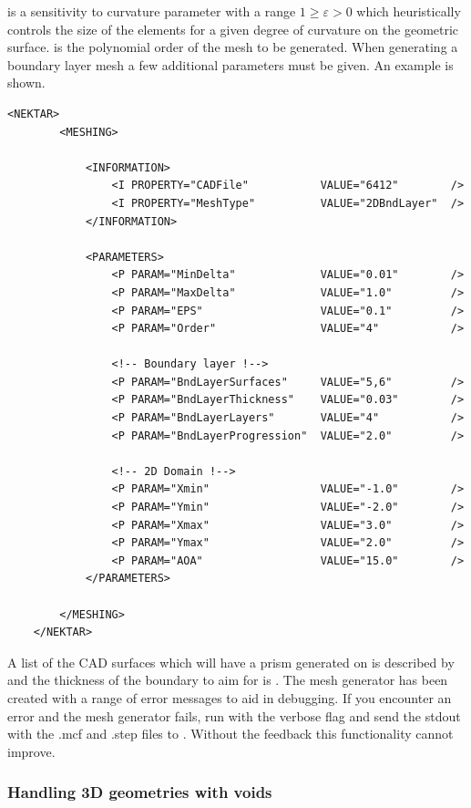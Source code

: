 is a sensitivity to curvature parameter with a range $1 \geq \varepsilon > 0$
which heuristically controls the size of the elements for a given degree of
curvature on the geometric surface.  is the polynomial order of the
mesh to be generated.
%
When generating a boundary layer mesh a few additional parameters must be given.
An example is shown.
\begin{lstlisting}[style=XmlStyle]
    <NEKTAR>
        <MESHING>

            <INFORMATION>
                <I PROPERTY="CADFile"           VALUE="6412"        />
                <I PROPERTY="MeshType"          VALUE="2DBndLayer"  />
            </INFORMATION>

            <PARAMETERS>
                <P PARAM="MinDelta"             VALUE="0.01"        />
                <P PARAM="MaxDelta"             VALUE="1.0"         />
                <P PARAM="EPS"                  VALUE="0.1"         />
                <P PARAM="Order"                VALUE="4"           />

                <!-- Boundary layer !-->
                <P PARAM="BndLayerSurfaces"     VALUE="5,6"         />
                <P PARAM="BndLayerThickness"    VALUE="0.03"        />
                <P PARAM="BndLayerLayers"       VALUE="4"           />
                <P PARAM="BndLayerProgression"  VALUE="2.0"         />

                <!-- 2D Domain !-->
                <P PARAM="Xmin"                 VALUE="-1.0"        />
                <P PARAM="Ymin"                 VALUE="-2.0"        />
                <P PARAM="Xmax"                 VALUE="3.0"         />
                <P PARAM="Ymax"                 VALUE="2.0"         />
                <P PARAM="AOA"                  VALUE="15.0"        />
            </PARAMETERS>

        </MESHING>
    </NEKTAR>
\end{lstlisting}
A list of the CAD surfaces which will have a prism generated on is described by
 and the thickness of the boundary to aim for is .
%
The mesh generator has been created with a range of error messages to aid in
debugging. If you encounter an error and the mesh generator fails, run \nm with
the verbose  flag and send the stdout with the .mcf and .step files to
. Without the feedback this functionality cannot
improve.

\subsubsection{Handling 3D geometries with voids}

